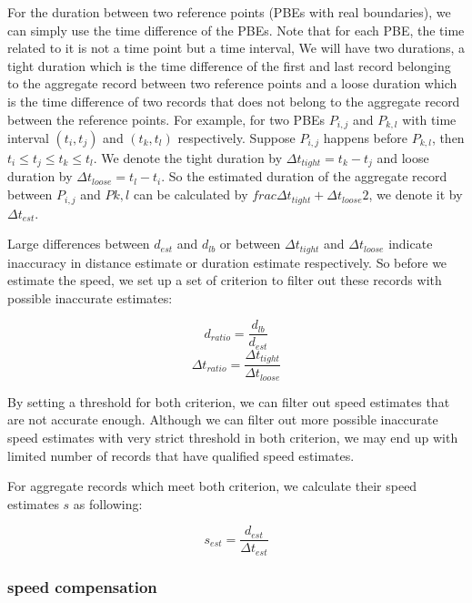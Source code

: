 For the duration between two reference points (PBEs with real boundaries), we can simply use the time difference of the PBEs. Note that for each PBE, the time related to it is not a time point but a time interval, We will have two durations, a tight duration which is the time difference of the first and last record belonging to the aggregate record between two reference points and a loose duration which is the time difference of two records that does not belong to the aggregate record between the reference points. For example, for two PBEs $P_{i,j}$ and $P_{k,l}$ with time interval $(t_i, t_j)$ and $(t_k, t_l)$ respectively. Suppose $P_{i,j}$ happens before $P_{k,l}$, then $t_i \leq t_j \leq t_k \leq t_l$. We denote the tight duration by $\Delta t_{tight} = t_k - t_j$ and loose duration by $\Delta t_{loose} = t_l - t_i$. So the estimated duration of the aggregate record between $P_{i,j}$ and $P{k,l}$ can be calculated by $frac{\Delta t_{tight} + \Delta t_{loose}}{2}$, we denote it by $\Delta t_{est}$.

Large differences between $d_{est}$ and $d_{lb}$ or between $\Delta t_{tight}$ and $\Delta t_{loose}$ indicate inaccuracy in distance estimate or duration estimate respectively. So before we estimate the speed, we set up a set of criterion to filter out these records with possible inaccurate estimates:

\begin{equation}
  d_{ratio} = \frac{d_{lb}}{d_{est}}
\end{equation}
\begin{equation}
	\Delta t_{ratio} = \frac{\Delta t_{tight}}{\Delta t_{loose}}
\end{equation}

By setting a threshold for both criterion, we can filter out speed estimates that are not accurate enough. Although we can filter out more possible inaccurate speed estimates with very strict threshold in both criterion, we may end up with limited number of records that have qualified speed estimates.

For aggregate records which meet both criterion, we calculate their speed estimates $s$ as following:

\begin{equation}
  s_{est} = \frac{d_{est}}{\Delta t_{est}} 
\end{equation}

\subsubsection{speed compensation}


